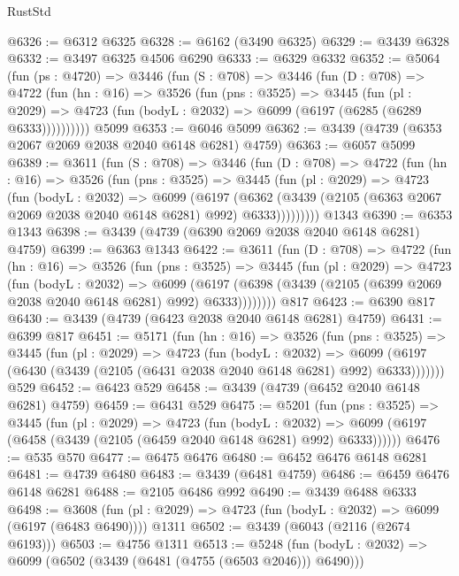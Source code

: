 \begin{lexlean}{RustStd}
\begin{coremodule}
@6326 := @6312 @6325
@6328 := @6162 (@3490 @6325)
@6329 := @3439 @6328
@6332 := @3497 @6325 @4506 @6290
@6333 := @6329 @6332
@6352 := @5064
    (fun (ps : @4720) =>
    @3446
      (fun (S : @708) =>
      @3446
        (fun (D : @708) =>
        @4722
          (fun (hn : @16) =>
          @3526
            (fun (pns : @3525) =>
            @3445
              (fun (pl : @2029) =>
              @4723 (fun (bodyL : @2032) => @6099 (@6197 (@6285 (@6289 @6333))))))))))
    @5099
@6353 := @6046 @5099
@6362 := @3439 (@4739 (@6353 @2067 @2069 @2038 @2040 @6148 @6281) @4759)
@6363 := @6057 @5099
@6389 := @3611
    (fun (S : @708) =>
    @3446
      (fun (D : @708) =>
      @4722
        (fun (hn : @16) =>
        @3526
          (fun (pns : @3525) =>
          @3445
            (fun (pl : @2029) =>
            @4723
              (fun (bodyL : @2032) =>
              @6099
                (@6197
                  (@6362
                    (@3439 (@2105 (@6363 @2067 @2069 @2038 @2040 @6148 @6281) @992) @6333)))))))))
    @1343
@6390 := @6353 @1343
@6398 := @3439 (@4739 (@6390 @2069 @2038 @2040 @6148 @6281) @4759)
@6399 := @6363 @1343
@6422 := @3611
    (fun (D : @708) =>
    @4722
      (fun (hn : @16) =>
      @3526
        (fun (pns : @3525) =>
        @3445
          (fun (pl : @2029) =>
          @4723
            (fun (bodyL : @2032) =>
            @6099
              (@6197 (@6398 (@3439 (@2105 (@6399 @2069 @2038 @2040 @6148 @6281) @992) @6333))))))))
    @817
@6423 := @6390 @817
@6430 := @3439 (@4739 (@6423 @2038 @2040 @6148 @6281) @4759)
@6431 := @6399 @817
@6451 := @5171
    (fun (hn : @16) =>
    @3526
      (fun (pns : @3525) =>
      @3445
        (fun (pl : @2029) =>
        @4723
          (fun (bodyL : @2032) =>
          @6099 (@6197 (@6430 (@3439 (@2105 (@6431 @2038 @2040 @6148 @6281) @992) @6333)))))))
    @529
@6452 := @6423 @529
@6458 := @3439 (@4739 (@6452 @2040 @6148 @6281) @4759)
@6459 := @6431 @529
@6475 := @5201
    (fun (pns : @3525) =>
    @3445
      (fun (pl : @2029) =>
      @4723
        (fun (bodyL : @2032) =>
        @6099 (@6197 (@6458 (@3439 (@2105 (@6459 @2040 @6148 @6281) @992) @6333))))))
@6476 := @535 @570
@6477 := @6475 @6476
@6480 := @6452 @6476 @6148 @6281
@6481 := @4739 @6480
@6483 := @3439 (@6481 @4759)
@6486 := @6459 @6476 @6148 @6281
@6488 := @2105 @6486 @992
@6490 := @3439 @6488 @6333
@6498 := @3608
    (fun (pl : @2029) => @4723 (fun (bodyL : @2032) => @6099 (@6197 (@6483 @6490))))
    @1311
@6502 := @3439 (@6043 (@2116 (@2674 @6193)))
@6503 := @4756 @1311
@6513 := @5248
    (fun (bodyL : @2032) => @6099 (@6502 (@3439 (@6481 (@4755 (@6503 @2046))) @6490)))

\end{coremodule}
\end{lexlean}
